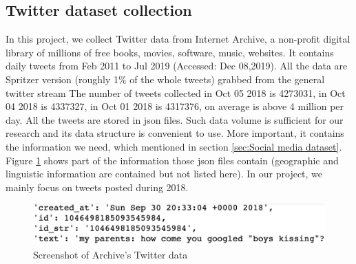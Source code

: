 \subsection{Twitter dataset collection}
\label{sec:Twitter dataset}
In this project, we collect Twitter data from Internet Archive\cite{archive}, a non-profit digital library of millions of free books, movies, software, music, websites. It contains daily tweets from Feb 2011 to Jul 2019 (Accessed: Dec 08,2019). All the data are Spritzer version (roughly 1\% of the whole tweets) grabbed from the general twitter stream The number of tweets collected in Oct 05 2018 is 4273031, in Oct 04 2018 is 4337327, in Oct 01 2018 is 4317376, on average is above 4 million per day. All the tweets are stored in json files. Such data volume is sufficient for our research and its data structure is convenient to use. More important, it contains the information we need, which mentioned in section \ref{sec:Social media dataset}. Figure \ref{fig:archive1} shows part of the information those json files contain (geographic and linguistic information are contained but not listed here). In our project, we mainly focus on tweets posted during 2018.\\
\begin{figure}[!htbp]
    \center
    \includegraphics[width=5.5in]{images/archive1.png}
    \caption{Screenshot of Archive's Twitter data}
    \label{fig:archive1}
\end{figure} 

